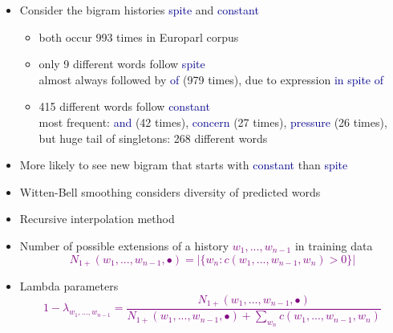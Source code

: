 \documentclass[landscape]{slides}
\newcommand{\example}[1]{\textcolor{darkblue}{\rm #1}}
\newcommand{\maths}[1]{\textcolor{purple}{#1}}
\begin{document}
\vspace{10mm}
\begin{itemize}
\item Consider the bigram histories \example{spite} and \example{constant}
\begin{itemize}
\item both occur 993 times in Europarl corpus
\vspace{3mm}
\item only 9 different words follow \example{spite}\\[1mm]
almost always followed by \example{of} (979 times), due to expression \example{in spite of}
\vspace{3mm}
\item 415 different words follow \example{constant}\\[1mm]
most frequent: \example{and} (42 times), \example{concern} (27 times), \example{pressure} (26 times),\\
but huge tail of singletons: 268 different words
\end{itemize}
\item More likely to see new bigram that starts with \example{constant} than \example{spite}
\item Witten-Bell smoothing considers diversity of predicted words
\end{itemize}


\vspace{10mm}
\begin{itemize}
\item Recursive interpolation method
\item Number of possible extensions of a history \maths{$w_1,...,w_{n-1}$} in training data
\maths{\begin{equation*}
N_{1+}(w_1,...,w_{n-1},\bullet) = |\{w_n:c(w_1,...,w_{n-1},w_n)>0\}|
\end{equation*}}
\vspace{-12mm}
\item Lambda parameters
\maths{\begin{equation*}
1-\lambda_{w_1,...,w_{n-1}} = \frac{N_{1+}(w_1,...,w_{n-1},\bullet)}{N_{1+}(w_1,...,w_{n-1},\bullet) + \sum_{w_n} c(w_1,...,w_{n-1},w_n)}
\end{equation*}}
\end{itemize}

\end{document}
